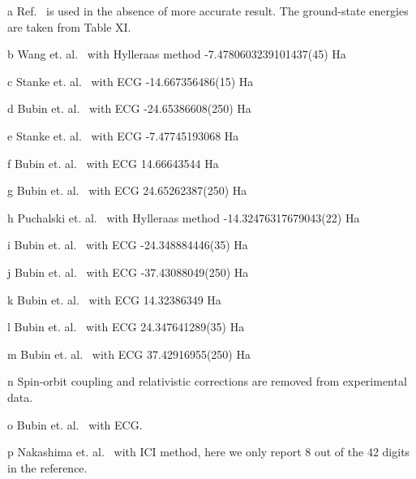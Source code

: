\begin{table*}[t!]
\begin{threeparttable}
\begin{tablenotes}
\item[a] Ref.~\cite{Davidson_Atoms} is used in the absence of more accurate result. The ground-state energies are taken from Table XI.
\item[b] Wang et. al.~\cite{Wang_Li} with Hylleraas method -7.4780603239101437(45) Ha
\item[c] Stanke et. al.~\cite{Stanke_Be} with ECG -14.667356486(15) Ha
\item[d] Bubin et. al.~\cite{Bubin_B} with ECG -24.65386608(250) Ha
\item[e] Stanke et. al.~\cite{Stanke_Li0} with ECG -7.47745193068 Ha
\item[f] Bubin et. al.~\cite{Bubin_BeH_noBO} with ECG \text{-}14.66643544 Ha
\item[g] Bubin et. al.~\cite{Bubin_B} with ECG \text{-}24.65262387(250) Ha
\item[h] Puchalski et. al.~\cite{Puchalski_Be+} with Hylleraas method -14.32476317679043(22) Ha
\item[i] Bubin et. al.~\cite{Bubin_B+} with ECG -24.348884446(35) Ha
\item[j] Bubin et. al.~\cite{Bubin_C+,mitroy2013} with ECG -37.43088049(250) Ha
\item[k] Bubin et. al.~\cite{Bubin_BeH_noBO} with ECG \text{-}14.32386349 Ha
\item[l] Bubin et. al.~\cite{Bubin_B+} with ECG \text{-}24.347641289(35) Ha
\item[m] Bubin et. al.~\cite{Bubin_C+} with ECG \text{-}37.42916955(250) Ha
\item[n] Spin-orbit coupling and relativistic corrections are removed from experimental data.~\cite{Klopper_IP,NIST_Atoms}
\item[o] Bubin et. al.~\cite{Bubin_C} with ECG.
\item[p] Nakashima et. al.~\cite{Nakashima_Li+} with ICI method, here we only report 8 out of the 42 digits in the reference.
\end{tablenotes}

\end{threeparttable}
\end{table*}